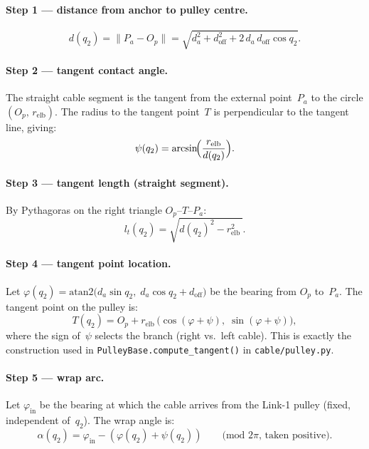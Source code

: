 \documentclass[11pt, a4paper]{article}
\begin{document}
\paragraph{Step 1 --- distance from anchor to pulley centre.}
%
\begin{equation}\label{eq:dist}
    d(q_2) = \lVert P_a - O_p \rVert
    = \sqrt{d_a^2 + d_{\text{off}}^2 + 2\,d_a\,d_{\text{off}}\cos q_2}.
\end{equation}

\paragraph{Step 2 --- tangent contact angle.}
The straight cable segment is the tangent from the external point~$P_a$ to
the circle $(O_p,\,r_{\text{elb}})$.  The radius to the tangent
point~$T$ is perpendicular to the tangent line, giving:
%
\begin{equation}\label{eq:psi}
    \psi(q_2) = \arcsin\!\Bigl(\frac{r_{\text{elb}}}{d(q_2)}\Bigr).
\end{equation}

\paragraph{Step 3 --- tangent length (straight segment).}
By Pythagoras on the right triangle $O_p$--$T$--$P_a$:
%
\begin{equation}\label{eq:lt}
    l_t(q_2) = \sqrt{d(q_2)^2 - r_{\text{elb}}^2\,}.
\end{equation}

\paragraph{Step 4 --- tangent point location.}
Let $\varphi(q_2) = \mathrm{atan2}\!\bigl(d_a \sin q_2,\;
d_a \cos q_2 + d_{\text{off}}\bigr)$ be the bearing from $O_p$ to~$P_a$.
The tangent point on the pulley is:
%
\begin{equation}\label{eq:Tpoint}
    T(q_2) = O_p + r_{\text{elb}}\,
    \bigl(\cos(\varphi + \psi),\;\sin(\varphi + \psi)\bigr),
\end{equation}
%
where the sign of~$\psi$ selects the branch (right vs.\ left cable).
This is exactly the construction used in \texttt{PulleyBase.compute\_tangent()}
in \texttt{cable/pulley.py}.

\paragraph{Step 5 --- wrap arc.}
Let $\varphi_{\text{in}}$ be the bearing at which the cable arrives from the
Link-1 pulley (fixed, independent of~$q_2$).  The wrap angle is:
%
\begin{equation}\label{eq:alpha}
    \alpha(q_2) = \varphi_{\text{in}} - (\varphi(q_2) + \psi(q_2))
    \qquad\text{(mod $2\pi$, taken positive).}
\end{equation}
\end{document}
